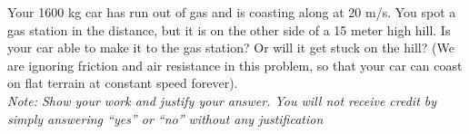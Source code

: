 \question[20]  Your 1600 kg car has run out of gas and is coasting along at 20 m/s. You spot a gas station in the distance, but it is on the other side of a 15 meter high hill. Is your car able to make it to the gas station? Or will it get stuck on the hill? (We are ignoring friction and air resistance in this problem, so that your car can coast on flat terrain at constant speed forever).\\ \textit{Note: Show your work and justify your answer. You will not receive credit by simply answering ``yes'' or ``no'' without any justification}
